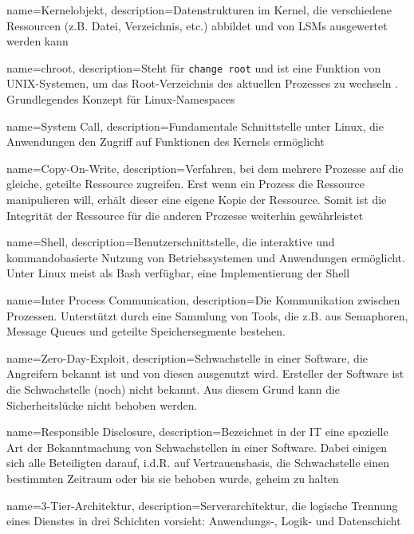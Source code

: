 {%
  name={Kernelobjekt},
  description={Datenstrukturen im Kernel, die verschiedene Ressourcen (z.B. Datei, Verzeichnis, etc.) abbildet und von LSMs ausgewertet werden kann \cite{kernelObjects}}
}

{%
  name={chroot},
  description={Steht für \texttt{change root} und ist eine Funktion von UNIX-Systemen, um das Root-Verzeichnis des aktuellen Prozesses zu wechseln \cite{chroot}. Grundlegendes Konzept für Linux-Namespaces}
}

{%
  name={System Call},
  description={Fundamentale Schnittstelle unter Linux, die Anwendungen den Zugriff auf Funktionen des Kernels ermöglicht \cite{systemcall}}
}

{%
  name={Copy-On-Write},
  description={Verfahren, bei dem mehrere Prozesse auf die gleiche, geteilte Ressource zugreifen. Erst wenn ein Prozess die Ressource manipulieren will, erhält dieser eine eigene Kopie der Ressource. Somit ist die Integrität der Ressource für die anderen Prozesse weiterhin gewährleistet \cite{dockerImagesAndContainers}}
}

{%
  name={Shell},
  description={Benutzerschnittstelle, die interaktive und kommandobasierte Nutzung von Betriebssystemen und Anwendungen ermöglicht. Unter Linux meist als Bash verfügbar, eine Implementierung der Shell}
}

{%
  name={Inter Process Communication},
  description={Die Kommunikation zwischen Prozessen. Unterstützt durch eine Sammlung von Tools, die z.B. aus Semaphoren, Message Queues und geteilte Speichersegmente bestehen.}
}


{%
  name={Zero-Day-Exploit},
  description={Schwachstelle in einer Software, die Angreifern bekannt ist und von diesen ausgenutzt wird. Ersteller der Software ist die Schwachstelle (noch) nicht bekannt. Aus diesem Grund kann die Sicherheitslücke nicht behoben werden.}
}

{%
  name={Responsible Disclosure},
  description={Bezeichnet in der IT eine spezielle Art der Bekanntmachung von Schwachstellen in einer Software. Dabei einigen sich alle Beteiligten darauf, i.d.R. auf Vertrauensbasis, die Schwachstelle einen bestimmten Zeitraum oder bis sie behoben wurde, geheim zu halten}
}

{%
  name={3-Tier-Architektur},
  description={Serverarchitektur, die logische Trennung eines Dienstes in drei Schichten vorsieht: Anwendungs-, Logik- und Datenschicht}
}

